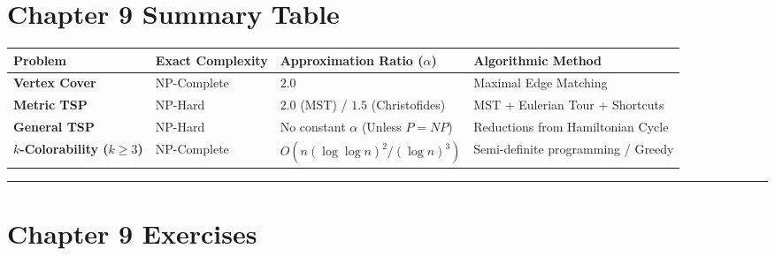 \documentclass[
]{book}
\newcounter{none} %
\theoremstyle{definition}
\theoremstyle{definition}
\theoremstyle{definition}
\theoremstyle{definition}
\theoremstyle{remark}
\begin{document}
\section{Chapter 9 Summary Table}\label{chapter-9-summary-table}

{\def\LTcaptype{none} %
\begin{longtable}[]{@{}
  >{\raggedright\arraybackslash}p{}
  >{\raggedright\arraybackslash}p{}
  >{\raggedright\arraybackslash}p{}
  >{\raggedright\arraybackslash}p{}@{}}
\toprule\noalign{}
\begin{minipage}[b]{\linewidth}\raggedright
Problem
\end{minipage} & \begin{minipage}[b]{\linewidth}\raggedright
Exact Complexity
\end{minipage} & \begin{minipage}[b]{\linewidth}\raggedright
Approximation Ratio (\(\alpha\))
\end{minipage} & \begin{minipage}[b]{\linewidth}\raggedright
Algorithmic Method
\end{minipage} \\
\midrule\noalign{}
\endhead
\bottomrule\noalign{}
\endlastfoot
\textbf{Vertex Cover} & NP-Complete & \(2.0\) & Maximal Edge Matching \\
\textbf{Metric TSP} & NP-Hard & \(2.0\) (MST) / \(1.5\) (Christofides) & MST + Eulerian Tour + Shortcuts \\
\textbf{General TSP} & NP-Hard & No constant \(\alpha\) (Unless \(P=NP\)) & Reductions from Hamiltonian Cycle \\
\textbf{\(k\)-Colorability (\(k \ge 3\))} & NP-Complete & \(O(n(\log \log n)^2 / (\log n)^3)\) & Semi-definite programming / Greedy \\
\end{longtable}
}

\begin{center}\rule{0.5\linewidth}{0.5pt}\end{center}

\section{Chapter 9 Exercises}\label{chapter-9-exercises}
\end{document}
